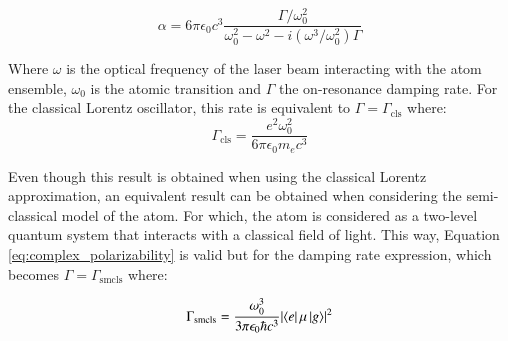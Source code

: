 \begin{equation}\label{eq:complex_polarizability}
	\alpha = 6 \pi \epsilon_0 c^3 \frac{\Gamma/\omega_0^2}{\omega_0^2 -\omega^2 -i(\omega^3/\omega_0^2)\Gamma} 
\end{equation} 

Where $\omega$ is the optical frequency of the laser beam interacting with the atom ensemble, $\omega_0$ is the atomic transition and $\Gamma$ the on-resonance damping rate. For the classical Lorentz oscillator, this rate is equivalent to $\Gamma = \Gamma_\text{cls}$ where:
\begin{equation}\label{eq:classical_damping_rate}
	\Gamma_\text{cls} = \frac{e^2 \omega_0^2}{6\pi\epsilon_0m_ec^3}
\end{equation}

Even though this result is obtained when using the classical Lorentz approximation, an equivalent result can be obtained when considering the semi-classical model of the atom. For which, the atom is considered as a two-level quantum system that interacts with a classical field of light. This way, Equation \eqref{eq:complex_polarizability} is valid but for the damping rate expression, which becomes $\Gamma = \Gamma_\text{smcls}$ where:

\begin{equation}\label{eq:semiclassical_damping_rate}
	\Gamma_\text{smcls} = \frac{\omega_0^3}{3\pi\epsilon_0 \hbar c^3} \mathopen|\bra{e}\mu\ket{g}\mathclose|^2
\end{equation}

\iffalse
It must be noted that this semi-classical model uses the electric dipole approximation, which assumes the laser transition to have a wavelength way greater that the typical size of the atom. This is a reasonable approximation for most of the cases but will be considered as a possible source of errors in our model.
\fi

